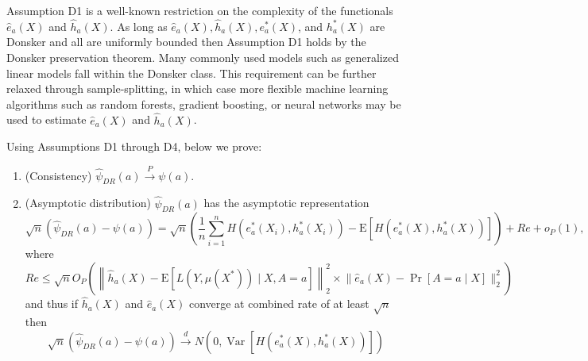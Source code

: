 Assumption D1 is a well-known restriction on the complexity of the functionals $\widehat{e}_a(X)$ and $\widehat{h}_a(X)$. As long as $\widehat{e}_a(X), \widehat{h}_a(X), e^*_a(X)$, and $h^*_a(X)$ are Donsker and all are uniformly bounded then Assumption D1 holds by the Donsker preservation theorem. Many commonly used models such as generalized linear models fall within the Donsker class. This requirement can be further relaxed through sample-splitting, in which case more flexible machine learning algorithms such as random forests, gradient boosting, or neural networks may be used to estimate $\widehat{e}_a(X)$ and $\widehat{h}_a(X)$. 

Using Assumptions D1 through D4, below we prove:
\begin{enumerate}
    \item (Consistency) $\widehat{\psi}_{DR}(a) \stackrel{P}{\longrightarrow} \psi(a)$.
    \item (Asymptotic distribution) $\widehat{\psi}_{DR}(a)$ has the asymptotic representation
    $$
    \sqrt{n}\left(\widehat{\psi}_{DR}(a)-\psi(a)\right)=\sqrt{n}\left(\frac{1}{n} \sum_{i=1}^n H\left(e^*_a(X_i), h^*_a(X_i)\right)-\mathrm{E}\left[H\left(e^*_a(X), h^*_a(X)\right)\right]\right)+R e+o_P(1),
    $$
    where
    $$
    R e \leq \sqrt{n} O_P\left(\left\|\widehat{h}_a(X)-\mathrm{E}\left[L\left(Y, \mu(X^*)\right) \mid X, A=a\right]\right\|_2^2 \times\Big\|\widehat{e}_a(X)-\operatorname{Pr}[A=a \mid X]\Big\|_2^2\right) 
    $$
    and thus if $\widehat{h}_a(X)$ and $\widehat{e}_a(X)$ converge at combined rate of at least $\sqrt{n}$ then
    $$
    \sqrt{n}\left(\widehat{\psi}_{DR}(a)-\psi(a)\right) \stackrel{d}{\longrightarrow} N\left(0, \operatorname{Var}\left[H(e^*_a(X), h^*_a(X))\right]\right)
    $$
\end{enumerate}


